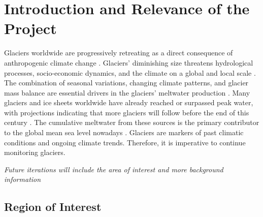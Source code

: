 \section{Introduction and Relevance of the Project}\label{introduction}
Glaciers worldwide are progressively retreating as a direct consequence of anthropogenic climate change \cite{immerzeel-2019, marzeion-2014, hugonnet-2021}. Glaciers' diminishing size threatens hydrological processes, socio-economic dynamics, and the climate on a global and local scale \cite{roberts-2022}. The combination of seasonal variations, changing climate patterns, and glacier mass balance are essential drivers in the glaciers' meltwater production \cite{viviroli-2011}. Many glaciers and ice sheets worldwide have already reached or surpassed peak water, with projections indicating that more glaciers will follow before the end of this century \cite{huss-2018}. The cumulative meltwater from these sources is the primary contributor to the global mean sea level nowadays \cite{roberts-2022}. Glaciers are markers of past climatic conditions and ongoing climate trends. Therefore, it is imperative to continue monitoring glaciers.

\textit{Future iterations will include the area of interest and more background information}

\subsection{Region of Interest}

